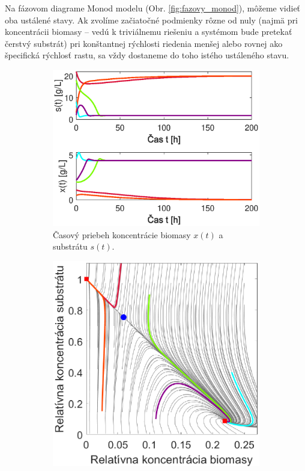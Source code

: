 Na  fázovom diagrame Monod modelu (Obr. \ref{fig:fazovy_monod}), môžeme vidieť oba ustálené stavy. Ak zvolíme začiatočné podmienky rôzne od nuly (najmä pri koncentrácii biomasy -- vedú k triviálnemu riešeniu a systémom bude pretekať čerstvý substrát) pri konštantnej rýchlosti riedenia menšej alebo rovnej ako špecifická rýchlosť rastu, sa vždy dostaneme do toho istého ustáleného stavu.

\begin{figure}
	\centering
	\begin{subfigure}[b]{0.49\textwidth}
		\centering
		\includegraphics[width=\linewidth]{images/phase1_haldane}
		\caption{Časový priebeh koncentrácie biomasy $ x(t) $ a substrátu $ s(t) $.}
		\label{fig:fazovy_vyber_haldane}
	\end{subfigure}
	\begin{subfigure}[b]{0.49\textwidth}
		\centering
		\includegraphics[width=\linewidth]{images/phase2_haldane}

\end{subfigure}
\end{figure}
